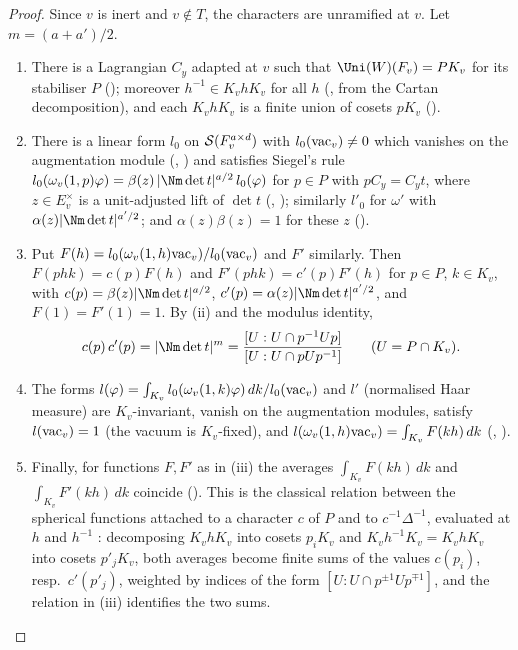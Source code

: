 \begin{proof}
Since $v$ is inert and $v\notin T$, the characters are unramified at $v$. Let $m=(a+a')/2$.
\begin{enumerate}[label=(\roman*)]
\item There is a Lagrangian $C_y$ adapted at $v$ such that $\Uni(W)(F_v)=PK_v$ for its stabiliser $P$
(); moreover $h^{-1}\in K_vhK_v$ for all $h$
(, from the Cartan decomposition), and each $K_vhK_v$ is a finite union of cosets
$pK_v$ ().
\item There is a linear form $l_0$ on $\mathcal{S}(F_v^{a\times d})$ with $l_0(\mathrm{vac}_v)\ne0$ which vanishes on the
augmentation module (, ) and satisfies
Siegel's rule $l_0(\omega_v(1,p)\varphi)=\beta(z)\,|\Nm\det t|^{a/2}\,l_0(\varphi)$ for $p\in P$ with $pC_y=C_yt$, where
$z\in E_v^\times$ is a unit-adjusted lift of $\det t$ (,
); similarly $l'_0$ for $\omega'$ with $\alpha(z)|\Nm\det t|^{a'/2}$; and
$\alpha(z)\beta(z)=1$ for these $z$ ().
\item Put $F(h)=l_0(\omega_v(1,h)\mathrm{vac}_v)/l_0(\mathrm{vac}_v)$ and $F'$ similarly. Then $F(phk)=c(p)F(h)$ and
$F'(phk)=c'(p)F'(h)$ for $p\in P$, $k\in K_v$, with $c(p)=\beta(z)|\Nm\det t|^{a/2}$, $c'(p)=\alpha(z)|\Nm\det t|^{a'/2}$,
and $F(1)=F'(1)=1$. By (ii) and the modulus identity,
\[
c(p)\,c'(p)=|\Nm\det t|^{m}=\frac{[U:U\cap p^{-1}Up]}{[U:U\cap pUp^{-1}]}\qquad(U=P\cap K_v).
\]
\item The forms $l(\varphi)=\int_{K_v}l_0(\omega_v(1,k)\varphi)\,dk/l_0(\mathrm{vac}_v)$ and $l'$ (normalised Haar measure)
are $K_v$-invariant, vanish on the augmentation modules, satisfy $l(\mathrm{vac}_v)=1$ (the vacuum is $K_v$-fixed), and
$l(\omega_v(1,h)\mathrm{vac}_v)=\int_{K_v}F(kh)\,dk$ (,
).
\item Finally, for functions $F,F'$ as in (iii) the averages $\int_{K_v}F(kh)\,dk$ and $\int_{K_v}F'(kh)\,dk$ coincide
(). This is the classical relation between the spherical functions attached to a
character $c$ of $P$ and to $c^{-1}\Delta^{-1}$, evaluated at $h$ and $h^{-1}$ \cite{Casselman1980}: decomposing $K_vhK_v$
into cosets $p_iK_v$ and $K_vh^{-1}K_v=K_vhK_v$ into cosets $p'_jK_v$, both averages become finite sums of the values
$c(p_i)$, resp.\ $c'(p'_j)$, weighted by indices of the form $[U:U\cap p^{\pm1}Up^{\mp1}]$, and the relation in (iii)
identifies the two sums.
\end{enumerate}
\end{proof}

